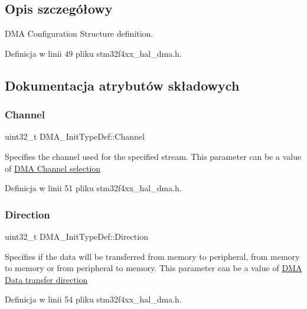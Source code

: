 \subsection{Opis szczegółowy}
D\+MA Configuration Structure definition. 

Definicja w linii 49 pliku stm32f4xx\+\_\+hal\+\_\+dma.\+h.



\subsection{Dokumentacja atrybutów składowych}
\mbox{\label{struct_d_m_a___init_type_def_af62608eb25864208cae5d59acef282a6}} 
\subsubsection{\texorpdfstring{Channel}{Channel}}
{\footnotesize\ttfamily uint32\+\_\+t D\+M\+A\+\_\+\+Init\+Type\+Def\+::\+Channel}

Specifies the channel used for the specified stream. This parameter can be a value of \hyperlink{group___d_m_a___channel__selection}{D\+MA Channel selection} 

Definicja w linii 51 pliku stm32f4xx\+\_\+hal\+\_\+dma.\+h.

\mbox{\label{struct_d_m_a___init_type_def_a0145b5d0e074fa8e2e185ecf2c4a15ca}} 
\subsubsection{\texorpdfstring{Direction}{Direction}}
{\footnotesize\ttfamily uint32\+\_\+t D\+M\+A\+\_\+\+Init\+Type\+Def\+::\+Direction}

Specifies if the data will be transferred from memory to peripheral, from memory to memory or from peripheral to memory. This parameter can be a value of \hyperlink{group___d_m_a___data__transfer__direction}{D\+MA Data transfer direction} 

Definicja w linii 54 pliku stm32f4xx\+\_\+hal\+\_\+dma.\+h.


